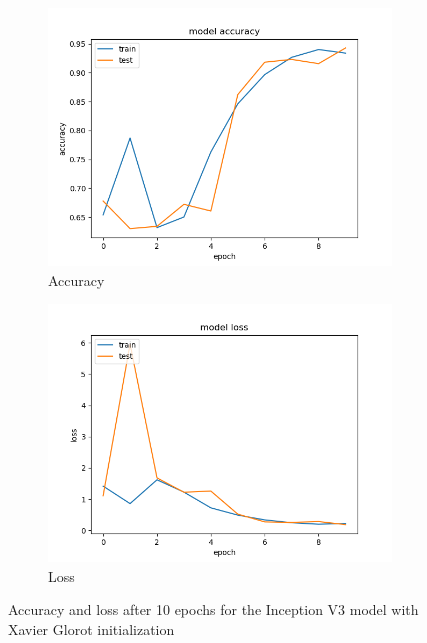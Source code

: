 \documentclass{article}
\theoremstyle{definition}
\theoremstyle{remark}
\begin{document}
\begin{figure}[h!]
\centering
\begin{subfigure}{.5\textwidth}
  \centering
  \includegraphics[width=1.2\linewidth]{img/from_scratch_models/Inceptionv3_acc.png}
  \caption{Accuracy}
  \label{fig:sub1}
\end{subfigure}%
\begin{subfigure}{.5\textwidth}
  \centering
  \includegraphics[width=1.2\linewidth]{img/from_scratch_models/Inceptionv3_loss.png}
  \caption{Loss}
  \label{fig:sub2}
\end{subfigure}
\caption{Accuracy and loss after 10 epochs for the Inception V3 model with Xavier Glorot initialization}
\label{fig:inception_v3_ten_epochs_xavier}
\end{figure}
\end{document}
